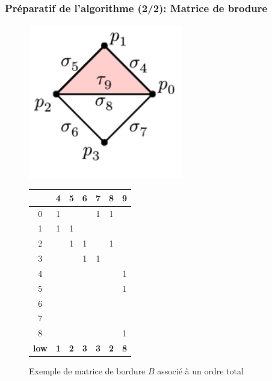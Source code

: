 \documentclass{beamer}
\begin{document}
\begin{frame}
    \frametitle{Préparatif de l'algorithme (2/2): Matrice de brodure}
    \fontsize{8}{10}\selectfont
    \begin{figure}[h]
        \centering
        \begin{minipage}[c]{0.45\linewidth}
            \centering
            \includegraphics[width=0.6\textwidth]{"../images/notationSimplexe.png"} 
        \end{minipage}
        \hfill
        \begin{tabular}{ c | c | c | c | c | c | c }
                & 4 & 5 & 6 & 7 & 8 & 9 \\ \hline
            0   & 1 &   &   & 1 & 1 &   \\ \hline
            1   & 1 & 1 &   &   &   &   \\ \hline
            2   &   & 1 & 1 &   & 1 &   \\ \hline
            3   &   &   & 1 & 1 &   &   \\ \hline
            4   &   &   &   &   &   & 1 \\ \hline
            5   &   &   &   &   &   & 1 \\ \hline
            6   &   &   &   &   &   &   \\ \hline
            7   &   &   &   &   &   &   \\ \hline
            8   &   &   &   &   &   & 1 \\ \hline
            \textbf{low} & \textbf{1} & \textbf{2} & \textbf{3} & 
            \textbf{3} & \textbf{2} & \textbf{8}
        \end{tabular}
        
        \caption{Exemple de matrice de bordure $B$ associé à un ordre total}
    \end{figure}
\end{frame}
\end{document}
